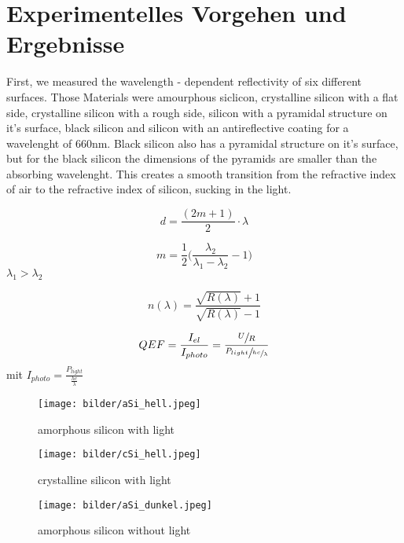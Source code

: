 \section{Experimentelles Vorgehen und Ergebnisse}
First, we measured the wavelength - dependent reflectivity of six different  surfaces.
Those Materials were amourphous siclicon, crystalline silicon with a flat side, crystalline silicon with a rough side, silicon with a pyramidal structure on it's surface, black silicon and silicon with an antireflective coating for a wavelenght of 660nm.
Black silicon also has a pyramidal structure on it's surface, but for the black silicon the dimensions of the pyramids are smaller than the absorbing wavelenght. This creates a smooth transition from the refractive index of air to the refractive index of silicon, sucking in the light.

\begin{equation}
  d = \frac{(2m + 1)}{2} \cdot \lambda
  \label{equ:thickness}
\end{equation}

\begin{equation}
  m = \frac{1}{2} \big( \frac{\lambda_2}{\lambda_1 - \lambda_2} - 1 \big)
  \label{equ:numwls}
\end{equation}
$\lambda_1 > \lambda_2$

\begin{equation}
  n(\lambda) = \frac{\sqrt{R(\lambda)} + 1 }{ \sqrt{R(\lambda)} - 1}
  \label{equ:refr_ind}
\end{equation}

\begin{equation}
  QEF = \frac{I_{el}}{I_{photo}} = \frac{\sfrac{U}{R}}{\sfrac{P_{light}}{\sfrac{hc}{\lambda}}}
\end{equation}
mit $I_{photo} = \frac{P_{light}}{\frac{hc}{\lambda}} $ 

\begin{figure}[h]
	\centering
	\texttt{[image: bilder/aSi\_hell.jpeg]}
	\caption{amorphous silicon with light}
	\label{fig:asi_hell}
\end{figure}

\begin{figure}[h]
	\centering
	\texttt{[image: bilder/cSi\_hell.jpeg]}
	\caption{crystalline silicon with light}
	\label{fig:csi_hell}
\end{figure}

\begin{figure}[h]
	\centering
	\texttt{[image: bilder/aSi\_dunkel.jpeg]}
	\caption{amorphous silicon without light}
	\label{fig:asi_dunkel}
\end{figure}

